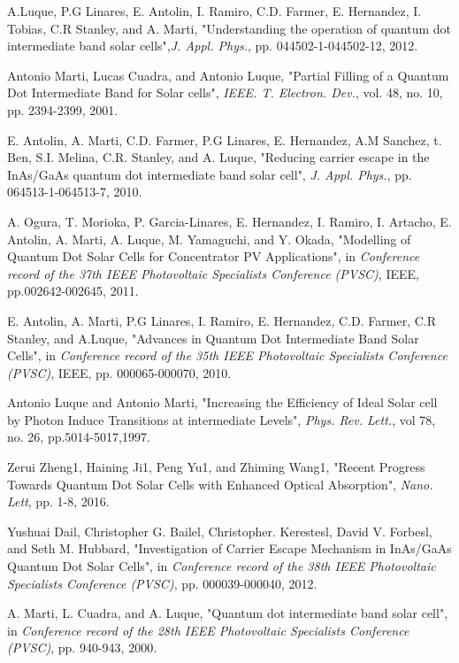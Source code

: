 \documentclass[hidelinks, 12pt]{report}
\begin{document}
\begin{thebibliography}{1}
 A.Luque, P.G Linares, E. Antolin, I. Ramiro, C.D. Farmer, E. Hernandez, I. Tobias, C.R Stanley, and A. Marti, "Understanding the operation of quantum dot intermediate band solar cells",{\textit{J. Appl. Phys.}}, pp. 044502-1-044502-12, 2012.

Antonio Marti, Lucas Cuadra, and Antonio Luque, "Partial Filling of a Quantum Dot Intermediate Band for Solar cells", {\textit{IEEE. T. Electron. Dev.}}, vol. 48, no. 10, pp. 2394-2399, 2001.


 E. Antolin, A. Marti,  C.D. Farmer, P.G Linares, E. Hernandez, A.M Sanchez, t. Ben, S.I. Melina, C.R. Stanley, and A. Luque, "Reducing carrier escape in the InAs/GaAs quantum dot intermediate band solar cell", {\textit{J. Appl. Phys.}}, pp. 064513-1-064513-7, 2010.

A. Ogura, T. Morioka, P. Garcia-Linares, E. Hernandez, I. Ramiro, I. Artacho, E. Antolin, A. Marti, A. Luque, M. Yamaguchi, and Y. Okada, "Modelling of Quantum Dot Solar Cells for Concentrator PV Applications", in {\textit{Conference record of the 37th IEEE Photovoltaic Specialists Conference (PVSC)}}, IEEE, pp.002642-002645, 2011.

E. Antolin, A. Marti, P.G Linares, I. Ramiro, E. Hernandez, C.D. Farmer, C.R Stanley, and A.Luque, "Advances in Quantum Dot Intermediate Band Solar Cells", in {\textit{Conference record of the 35th IEEE Photovoltaic Specialists Conference (PVSC)}}, IEEE, pp. 000065-000070, 2010.


 Antonio Luque and Antonio Marti, "Increasing the Efficiency of Ideal Solar cell by Photon Induce Transitions at intermediate Levels", {\textit{Phys. Rev. Lett.}}, vol 78, no. 26, pp.5014-5017,1997.


 Zerui Zheng1, Haining Ji1, Peng Yu1, and Zhiming Wang1, "Recent Progress Towards Quantum Dot Solar Cells with Enhanced Optical Absorption", {\textit{Nano. Lett}}, pp. 1-8, 2016.

 Yushuai Dail, Christopher G. Bailel, Christopher. Kerestesl, David V. Forbesl, and Seth M. Hubbard, "Investigation of Carrier Escape Mechanism in InAs/GaAs Quantum Dot Solar Cells", in {\textit{Conference record of the 38th IEEE Photovoltaic Specialists Conference (PVSC)}}, pp. 000039-000040, 2012. 

\bibitem{} A. Marti, L. Cuadra, and A. Luque, "Quantum dot intermediate band solar cell", in {\textit{Conference record of the 28th IEEE Photovoltaic Specialists Conference (PVSC)}}, pp. 940-943, 2000.


\end{thebibliography}
\end{document}
